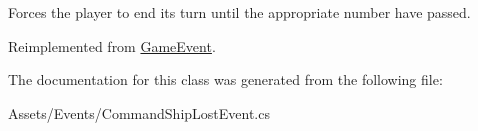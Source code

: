 Forces the player to end its turn until the appropriate number have passed. 



Reimplemented from \hyperlink{class_game_event_af4e3b9e9da59c616f4136851b7a35130}{Game\+Event}.



The documentation for this class was generated from the following file\+:\begin{DoxyCompactItemize}
\item 
Assets/\+Events/Command\+Ship\+Lost\+Event.\+cs\end{DoxyCompactItemize}
